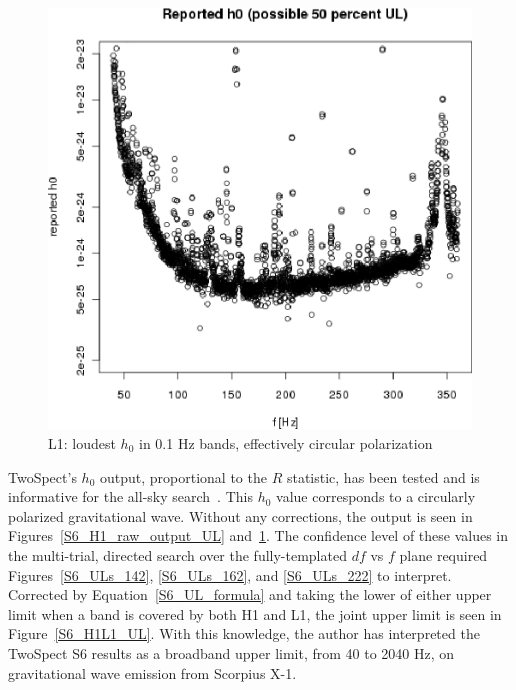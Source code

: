 \begin{figure}
\begin{center}
\includegraphics[width=0.68\paperwidth,height=0.48\paperheight]{plots/h0FullUL50log-L1.eps}
\caption{
L1: loudest $h_0$ in 0.1 Hz bands, effectively circular polarization}
\label{S6_L1_raw_output_UL}
\end{center}
\end{figure}

TwoSpect's $h_0$ output, proportional to the $R$ statistic, has been tested and is informative for the all-sky search~\cite{GoetzTwoSpectMethods2011,GoetzTwoSpectResults2014}.
This $h_0$ value corresponds to a circularly polarized gravitational wave.
Without any corrections, the output is seen in Figures~\ref{S6_H1_raw_output_UL} and~\ref{S6_L1_raw_output_UL}.
The confidence level of these values in the multi-trial, directed search over the fully-templated $df$ vs $f$ plane required Figures~\ref{S6_ULs_142}, \ref{S6_ULs_162}, and \ref{S6_ULs_222} to interpret. 
Corrected by Equation~\ref{S6_UL_formula} and taking the lower of either upper limit when a band is covered by both H1 and L1, the joint upper limit is seen in Figure~\ref{S6_H1L1_UL}.
With this knowledge, the author has interpreted the TwoSpect S6 results as a broadband upper limit, from 40 to 2040 Hz, on gravitational wave emission from Scorpius X-1.
